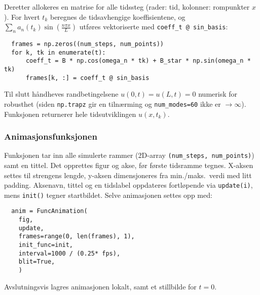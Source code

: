 Deretter allokeres en matrise for alle tidssteg (rader: tid, kolonner: rompunkter $x$). For hvert $t_k$ beregnes de tidsavhengige
koeffisientene, og $\sum_n a_n(t_k) \sin\!\left(\frac{n \pi x}{L}\right)$ utføres vektoriserte med \verb|coeff_t @ sin_basis|:
\begin{lstlisting}
  frames = np.zeros((num_steps, num_points))
  for k, tk in enumerate(t):
      coeff_t = B * np.cos(omega_n * tk) + B_star * np.sin(omega_n * tk)
      frames[k, :] = coeff_t @ sin_basis
\end{lstlisting}

Til slutt håndheves randbetingelsene $u(0, t) = u(L, t) = 0$ numerisk for robusthet (siden \verb|np.trapz|
gir en tilnærming og \verb|num_modes=60| ikke er $\to\infty$). Funksjonen returnerer hele tidsutviklingen $u(x, t_k)$.

\subsubsection{Animasjonsfunksjonen}
Funksjonen tar inn alle simulerte rammer (2D-array \verb|(num_steps, num_points)|) samt en tittel. Det opprettes figur og akse,
før første tidsramme tegnes. X-aksen settes til strengens lengde, y-aksen dimensjoneres fra min./maks.\ verdi med litt
padding. Aksenavn, tittel og en tidslabel oppdateres fortløpende via \verb|update(i)|, mens \verb|init()| tegner startbildet.
Selve animasjonen settes opp med:

\begin{lstlisting}
  anim = FuncAnimation(
    fig,
    update,
    frames=range(0, len(frames), 1),
    init_func=init,
    interval=1000 / (0.25* fps),
    blit=True,
    )
\end{lstlisting}

Avslutningsvis lagres animasjonen lokalt, samt et stillbilde for $t=0$.

